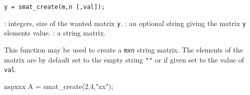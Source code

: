 
\begin{mandesc}
\end{mandesc}

\begin{calling_sequence}
\begin{verbatim}
y = smat_create(m,n [,val]);
\end{verbatim}
\end{calling_sequence}
\begin{parameters}
  \begin{varlist}
    : integers, size of the wanted matrix \verb!y!.
    : an optional string giving the matrix \verb!y! elements value.
    : a string matrix.
  \end{varlist}
\end{parameters}

\begin{mandescription}
  This function may be used to create a \verb+mxn+ string matrix. 
  The elements of the matrix are by default set to the empty string \verb+""+ 
  or if given set to the value of \verb+val+.
\end{mandescription}

\begin{examples}
  \begin{mintednsp}{nspxxx}
A = smat_create(2,4,"xx");
  \end{mintednsp}
\end{examples}

